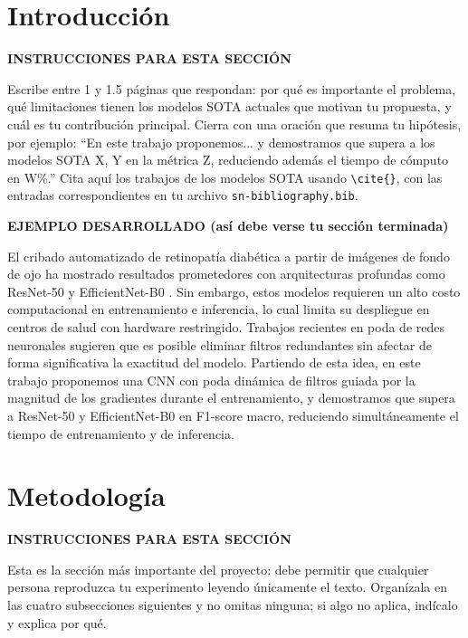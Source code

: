 \documentclass[pdflatex,sn-mathphys-num]{sn-jnl}
\newenvironment{instruccion}{%
  \par\noindent\textbf{\color{blue!55!black}INSTRUCCIONES PARA ESTA SECCIÓN}%
  \par\vspace{2pt}\noindent\itshape\small
}{%
  \par\normalfont\vspace{6pt}
}
\newenvironment{ejemplo}{%
  \par\noindent\textbf{\color{green!35!black}EJEMPLO DESARROLLADO (así debe verse tu sección terminada)}%
  \par\vspace{2pt}\noindent\small
}{%
  \par\normalfont\vspace{6pt}
}
\begin{document}
\section{Introducción}\label{sec:intro}

\begin{instruccion}
Escribe entre 1 y 1.5 páginas que respondan: por qué es importante el problema, qué limitaciones tienen los modelos SOTA actuales que motivan tu propuesta, y cuál es tu contribución principal. Cierra con una oración que resuma tu hipótesis, por ejemplo: ``En este trabajo proponemos... y demostramos que supera a los modelos SOTA X, Y en la métrica Z, reduciendo además el tiempo de cómputo en W\%.'' Cita aquí los trabajos de los modelos SOTA usando \texttt{\textbackslash cite\{\}}, con las entradas correspondientes en tu archivo \texttt{sn-bibliography.bib}.
\end{instruccion}

\begin{ejemplo}
El cribado automatizado de retinopatía diabética a partir de imágenes de fondo de ojo ha mostrado resultados prometedores con arquitecturas profundas como ResNet-50 \cite{bib1} y EfficientNet-B0 \cite{bib2}. Sin embargo, estos modelos requieren un alto costo computacional en entrenamiento e inferencia, lo cual limita su despliegue en centros de salud con hardware restringido. Trabajos recientes en poda de redes neuronales \cite{bib3} sugieren que es posible eliminar filtros redundantes sin afectar de forma significativa la exactitud del modelo. Partiendo de esta idea, en este trabajo proponemos una CNN con poda dinámica de filtros guiada por la magnitud de los gradientes durante el entrenamiento, y demostramos que supera a ResNet-50 y EfficientNet-B0 en F1-score macro, reduciendo simultáneamente el tiempo de entrenamiento y de inferencia.
\end{ejemplo}

\section{Metodología}\label{sec:metodologia}

\begin{instruccion}
Esta es la sección más importante del proyecto: debe permitir que cualquier persona reproduzca tu experimento leyendo únicamente el texto. Organízala en las cuatro subsecciones siguientes y no omitas ninguna; si algo no aplica, indícalo y explica por qué.
\end{instruccion}
\end{document}
